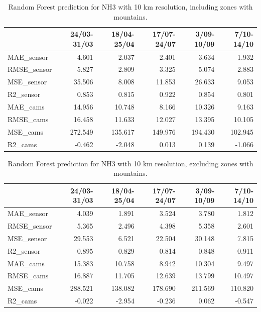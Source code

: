 \begin{table}[H]
\begin{tabular}{lrrrrr}
\toprule
  &  24/03-31/03 &  18/04-25/04 &  17/07-24/07 &  3/09-10/09 &  7/10-14/10 \\
\midrule
 MAE\_sensor &        4.601 &        2.037 &        2.401 &       3.634 &       1.932 \\
RMSE\_sensor &        5.827 &        2.809 &        3.325 &       5.074 &       2.883 \\
 MSE\_sensor &       35.506 &        8.008 &       11.853 &      26.633 &       9.053 \\
  R2\_sensor &        0.853 &        0.815 &        0.922 &       0.854 &       0.801 \\
   MAE\_cams &       14.956 &       10.748 &        8.166 &      10.326 &       9.163 \\
  RMSE\_cams &       16.458 &       11.633 &       12.027 &      13.395 &      10.105 \\
   MSE\_cams &      272.549 &      135.617 &      149.976 &     194.430 &     102.945 \\
    R2\_cams &       -0.462 &       -2.048 &        0.013 &       0.139 &      -1.066 \\
\bottomrule
\end{tabular}
\caption{Random Forest prediction for NH3 with 10 km resolution, including zones with mountains.}
\end{table}
\begin{table}[H]
\begin{tabular}{lrrrrr}
\toprule
 &  24/03-31/03 &  18/04-25/04 &  17/07-24/07 &  3/09-10/09 &  7/10-14/10 \\
\midrule
 MAE\_sensor &        4.039 &        1.891 &        3.524 &       3.780 &       1.812 \\
RMSE\_sensor &        5.365 &        2.496 &        4.398 &       5.358 &       2.601 \\
 MSE\_sensor &       29.553 &        6.521 &       22.504 &      30.148 &       7.815 \\
  R2\_sensor &        0.895 &        0.829 &        0.814 &       0.848 &       0.911 \\
   MAE\_cams &       15.383 &       10.758 &        8.942 &      10.304 &       9.497 \\
  RMSE\_cams &       16.887 &       11.705 &       12.639 &      13.799 &      10.497 \\
   MSE\_cams &      288.521 &      138.082 &      178.690 &     211.569 &     110.820 \\
    R2\_cams &       -0.022 &       -2.954 &       -0.236 &       0.062 &      -0.547 \\
\bottomrule
\end{tabular}
\caption{Random Forest prediction for NH3 with 10 km resolution, excluding zones with mountains.}
\end{table}
